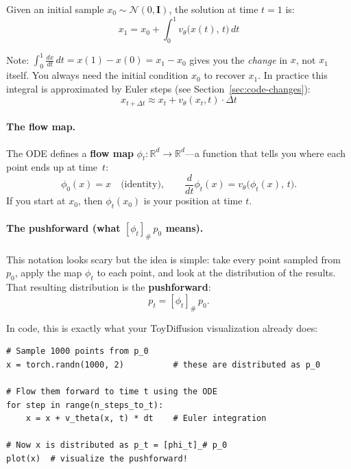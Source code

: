 \documentclass[11pt, a4paper]{article}
\newcommand{\vtheta}{v_\theta}
\newcommand{\R}{\mathbb{R}}
\newcommand{\N}{\mathcal{N}}
\newcommand{\Id}{\mathbf{I}}
\begin{document}
Given an initial sample $x_0 \sim \N(0, \Id)$, the solution at time $t{=}1$
is:
\begin{equation}
  \label{eq:ode-solution}
  x_1 = x_0 + \int_0^1 \vtheta\!\bigl(x(t),\, t\bigr)\, dt
\end{equation}

Note: $\int_0^1 \frac{dx}{dt}\,dt = x(1) - x(0) = x_1 - x_0$ gives you the
\emph{change} in $x$, not $x_1$ itself.  You always need the initial condition
$x_0$ to recover $x_1$.  In practice this integral is approximated by Euler
steps (see Section~\ref{sec:code-changes}):
\begin{equation}
  x_{t+\Delta t} \approx x_t + \vtheta(x_t, t) \cdot \Delta t
\end{equation}

\paragraph{The flow map.}
The ODE defines a \textbf{flow map} $\phi_t : \R^d \to \R^d$---a function
that tells you where each point ends up at time~$t$:
\[
  \phi_0(x) = x \quad \text{(identity)}, \qquad
  \frac{d}{dt}\phi_t(x) = \vtheta\!\bigl(\phi_t(x),\, t\bigr).
\]
If you start at $x_0$, then $\phi_t(x_0)$ is your position at time $t$.

\paragraph{The pushforward (what $[\phi_t]_\# \, p_0$ means).}
This notation looks scary but the idea is simple: take every point sampled
from $p_0$, apply the map $\phi_t$ to each point, and look at the
distribution of the results.  That resulting distribution is the
\textbf{pushforward}:
\begin{equation}
  p_t = [\phi_t]_\# \, p_0.
\end{equation}

In code, this is exactly what your ToyDiffusion visualization already does:
\begin{lstlisting}
# Sample 1000 points from p_0
x = torch.randn(1000, 2)          # these are distributed as p_0

# Flow them forward to time t using the ODE
for step in range(n_steps_to_t):
    x = x + v_theta(x, t) * dt    # Euler integration

# Now x is distributed as p_t = [phi_t]_# p_0
plot(x)  # visualize the pushforward!
\end{lstlisting}
\end{document}
